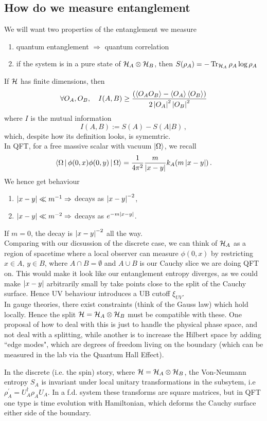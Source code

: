 \documentclass{article}
\begin{document}
\subsection{How do we measure entanglement}
We will want two properties of the entanglement we measure
\begin{enumerate}
	\item quantum entanglement $\Rightarrow$ quantum correlation
	\item if the system is in a pure state of $\mathcal{H}_A \otimes \mathcal{H}_B$, then $S(\rho_A) = - \operatorname{Tr}_{\mathcal{H}_A} \rho_A \log \rho_A$
\end{enumerate}
If $\mathcal{H}$ has finite dimensions, then 
\[
\forall O_A, O_B , \quad I(A, B) \geq \frac{\left( \left\langle O_A O_B \right\rangle - \left\langle O_A \right\rangle \left\langle O_B \right\rangle \right)}{2 \left\lvert O_A \right\rvert^2 \left\lvert O_B \right\rvert^2}
\]
where $I$ is the mutual information 
\[
I(A,B) := S(A) -S(A | B) \, , 
\]
which, despite how its definition looks, is symemtric. \\
In QFT, for a free massive scalar with vacuum $\ket{\Omega}$, we recall 
\[
\left\langle \Omega \, | \, \phi(0,x) \phi(0,y) \, | \, \Omega \right\rangle = \frac{1}{4 \pi^2} \frac{m}{\left\lvert x-y \right\rvert} k_A (m\left\lvert x-y \right\rvert) \, .
\]
We hence get behaviour 
\begin{enumerate}
	\item $\left\lvert x-y \right\rvert \ll m^{-1} \Rightarrow $ decays as $\left\lvert x-y \right\rvert^{-2}$, 
	\item $\left\lvert x-y \right\rvert \ll m^{-2} \Rightarrow $ decays as $e^{-m\left\lvert x-y \right\rvert}$.
\end{enumerate}
If $m=0$, the decay is $\left\lvert x-y \right\rvert^{-2}$ all the way. \\
Comparing with our dicsussion of the discrete case, we can think of $\mathcal{H}_A$ as a region of spacetime where a local observer can measure $\phi(0,x)$ by restricting $x \in A, \, y \in B$, where $A \cap B = \emptyset$ and $A \cup B$ is our Cauchy slice we are doing QFT on. This would make it look like our entanglement entropy diverges, as we could make $\left\lvert x-y \right\rvert$ arbitrarily small by take points close to the split of the Cauchy surface.  Hence UV behaviour introduces a UB cutoff $\xi_{UV}$. \\
In gauge theories, there exist constraints (think of the Gauss law) which hold locally. Hence the split $\mathcal{H} = \mathcal{H}_A \otimes \mathcal{H}_B$ must be compatible with these. One proposal of how to deal with this is just to handle the physical phase space, and not deal with a splitting, while another is to increase the Hilbert space by adding ``edge modes", which are degrees of freedom living on the boundary (which can be measured in the lab via the Quantum Hall Effect).  
\begin{remark}
	In the discrete (i.e. the spin) story, where $\mathcal{H} = \mathcal{H}_A \otimes \mathcal{H}_B$, the Von-Neumann entropy $S_A$ is invariant under local unitary transformations in the subsytem, i.e $\rho_A^\prime = U_A^\dagger \rho_A U_A $. In a f.d. system these transforms are square matrices, but in QFT one type is time evolution with Hamiltonian, which deforms the Cauchy surface either side of the boundary. 
\end{remark}
\end{document}
